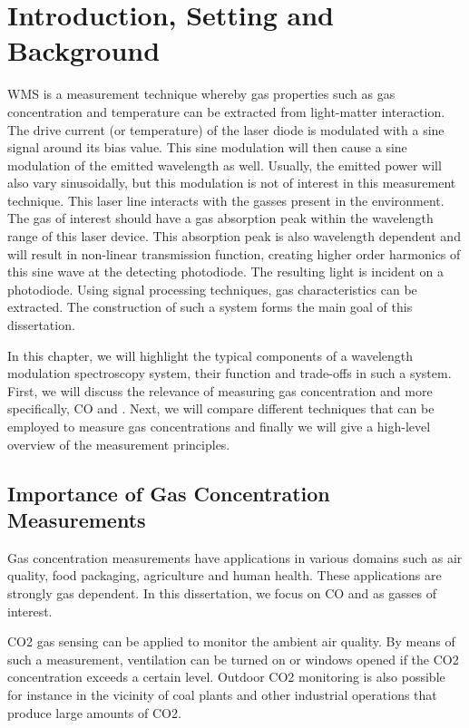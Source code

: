 \documentclass[\home/main.tex]{subfiles}
\begin{document}
\chapter{Introduction, Setting and Background}\label{background:setting-and-background}

\Acrfull{WMS} is a measurement technique where\-by gas properties such as gas concentration and temperature can be extracted from light-matter interaction. The drive current (or temperature) of the laser diode is modulated with a sine signal around its bias value. This sine modulation will then cause a sine modulation of the emitted wavelength as well. Usually, the emitted power will also vary sinusoidally, but this modulation is not of interest in this measurement technique. This laser line interacts with the gasses present in the environment. The gas of interest should have a gas absorption peak within the wavelength range of this laser device. This absorption peak is also wavelength dependent and will result in non-linear transmission function, creating higher order harmonics of this sine wave at the detecting photodiode. The resulting light is incident on a photodiode. Using signal processing techniques, gas characteristics can be extracted. The construction of such a system forms the main goal of this dissertation. 

In this chapter, we will highlight the typical components of a wavelength modulation spectroscopy system, their function and trade-offs in such a system. First, we will discuss the relevance of measuring gas concentration and more specifically, \acrfull{CO} and . Next, we will compare different techniques that can be employed to measure gas concentrations and finally we will give a high-level overview of the measurement principles.

\section{Importance of Gas Concentration Measurements}

  Gas concentration measurements have applications in various domains such as air quality, food packaging, agriculture and human health. These applications are strongly gas dependent. In this dissertation, we focus on \acrshort{CO} and  as gasses of interest.
  
  \acrshort{CO2} gas sensing can be applied to monitor the ambient air quality. By means of such a measurement, ventilation can be turned on or windows opened if the \acrshort{CO2} concentration exceeds a certain level. Outdoor \acrshort{CO2} monitoring is also possible for instance in the vicinity of coal plants and other industrial operations that produce large amounts of \acrshort{CO2}. 
  
\end{document}
